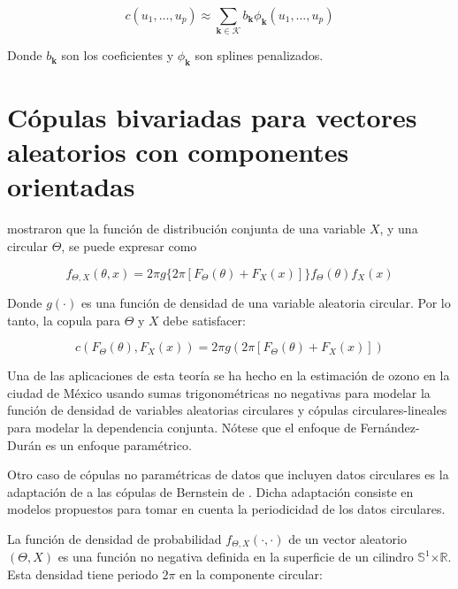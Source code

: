 \[c\left( u_{1},\ldots,u_{p} \right) \approx \sum_{\mathbf{k}\mathcal{\in K}}^{}{b_{\mathbf{k}}\phi_{\mathbf{k}}\left( u_{1},\ldots,u_{p} \right)}\]

\noindent
Donde \(b_{\mathbf{k}}\) son los coeficientes y \(\phi_{\mathbf{k}}\)
son splines penalizados.

\section{C\'opulas bivariadas para vectores aleatorios con componentes orientadas}\label{s:copCirLin}

\cite{johnson_angular-linear_1978,wehrly_bivariate_1980} mostraron que la
funci\'on de distribuci\'on conjunta de una variable \(X\), y una
circular \(\Theta\), se puede expresar como

$$f_{\Theta,X}\left( \theta,x \right) = 2\pi g \{ 2\pi\left\lbrack F_{\Theta}\left( \theta \right) + F_{X}\left( x \right) \right\rbrack \} f_{\Theta}\left( \theta \right)f_{X}\left( x \right)$$

Donde \(g\left( \cdot \right)\) es una funci\'on de densidad de una
variable aleatoria circular. Por lo tanto, la copula para \(\Theta\) y
\(X\) debe satisfacer:

$$c\left( F_{\Theta}\left( \theta \right),F_{X}\left( x \right) \right) = 2\pi g\left( 2\pi\left\lbrack F_{\Theta}\left( \theta \right) + F_{X}\left( x \right) \right\rbrack \right)$$

Una de las aplicaciones de esta teor\'ia se ha hecho en la estimaci\'on de ozono en la ciudad de M\'exico \cite{fernandezduran_modelling_2004} usando sumas trigonom\'etricas no negativas para modelar la funci\'on de densidad de variables aleatorias circulares y c\'opulas circulares-lineales para modelar la dependencia conjunta. N\'otese que el enfoque de Fern\'andez-Dur\'an es un enfoque param\'etrico.

Otro caso de c\'opulas no param\'etricas de datos que incluyen datos circulares es la adaptaci\'on de \cite{carnicero_non-parametric_2013} a las c\'opulas de Bernstein de \cite{sancetta_bernstein_2004}. Dicha adaptaci\'on consiste en modelos propuestos para tomar en cuenta la periodicidad de los datos circulares.

La funci\'on de densidad de probabilidad \(f_{\Theta,X}\left( \cdot , \cdot \right)\) de un vector aleatorio \(\left( \Theta,X \right)\) es una funci\'on no negativa definida en la superficie de un cilindro \(\mathbb{S}^{1}\mathbb{\times R}\). Esta densidad tiene periodo \(2\pi\) en la componente circular:

